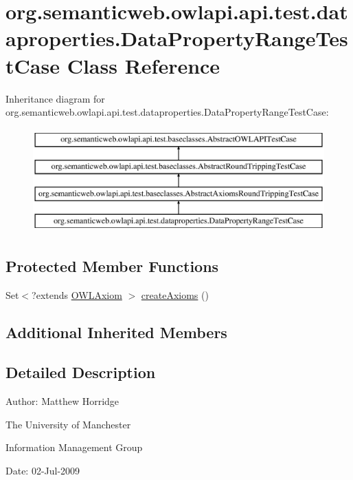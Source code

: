 \hypertarget{classorg_1_1semanticweb_1_1owlapi_1_1api_1_1test_1_1dataproperties_1_1_data_property_range_test_case}{\section{org.\-semanticweb.\-owlapi.\-api.\-test.\-dataproperties.\-Data\-Property\-Range\-Test\-Case Class Reference}
\label{classorg_1_1semanticweb_1_1owlapi_1_1api_1_1test_1_1dataproperties_1_1_data_property_range_test_case}
}
Inheritance diagram for org.\-semanticweb.\-owlapi.\-api.\-test.\-dataproperties.\-Data\-Property\-Range\-Test\-Case\-:\begin{figure}[H]
\begin{center}
\leavevmode
\includegraphics[height=4.000000cm]{classorg_1_1semanticweb_1_1owlapi_1_1api_1_1test_1_1dataproperties_1_1_data_property_range_test_case}
\end{center}
\end{figure}
\subsection*{Protected Member Functions}
\begin{DoxyCompactItemize}
\item 
Set$<$?extends \hyperlink{interfaceorg_1_1semanticweb_1_1owlapi_1_1model_1_1_o_w_l_axiom}{O\-W\-L\-Axiom} $>$ \hyperlink{classorg_1_1semanticweb_1_1owlapi_1_1api_1_1test_1_1dataproperties_1_1_data_property_range_test_case_ae98383799aa5c2baf60f6f7150612c8b}{create\-Axioms} ()
\end{DoxyCompactItemize}
\subsection*{Additional Inherited Members}


\subsection{Detailed Description}
Author\-: Matthew Horridge\par
 The University of Manchester\par
 Information Management Group\par
 Date\-: 02-\/\-Jul-\/2009 

